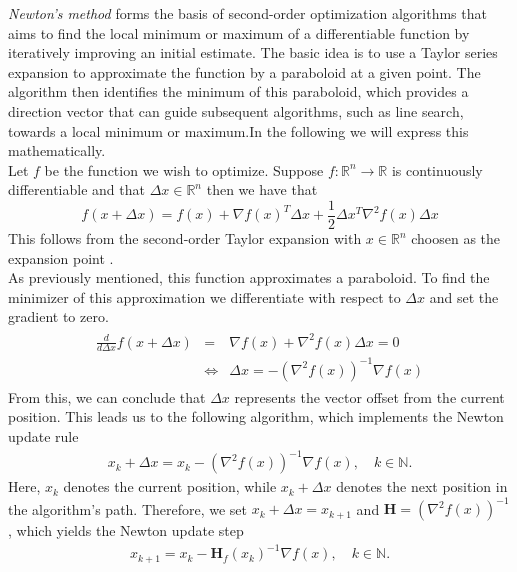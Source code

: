 \emph{Newton's method} forms the basis of second-order optimization algorithms that aims to find the local minimum or maximum of a differentiable function by iteratively improving an initial estimate. 
The basic idea is to use a Taylor series expansion to approximate the function by a paraboloid at a given point.
The algorithm then identifies the minimum of this paraboloid, which provides a direction vector that can guide subsequent algorithms,
such as line search, towards a local minimum or maximum.In the following we will express this mathematically.\\
Let $f$ be the function we wish to optimize. 
Suppose \( f: \mathbb{R}^n \to \mathbb{R} \) is continuously differentiable and that $\Delta x \in \mathbb{R}^n$ then we have
that
\label{eq:taylor}
\begin{equation}
    f(x+\Delta x ) = f(x) + \nabla f(x)^T\Delta x  + \frac{1}{2}\Delta x ^T\nabla^2f(x)\Delta x 
\end{equation}
This follows from the second-order Taylor expansion with $x \in \mathbb{R}^n$ choosen as the expansion point \cite{nocedal2006numerical}.\\
As previously mentioned, this function approximates a paraboloid. To find the minimizer of this approximation we differentiate with respect to $\Delta x $ and set the gradient to zero.
\begin{align}
    \begin{array}{rcl}
    \frac{d}{d\Delta x } f(x+\Delta x ) & = & \nabla f(x) + \nabla^2 f(x) \Delta x  = 0 \\
    & \iff & \Delta x  = -(\nabla^2 f(x))^{-1} \nabla f(x)
    \end{array}
\end{align}
From this, we can conclude that $\Delta x $ represents the vector offset from the current position. This leads us to the following algorithm, which implements the Newton update rule
\begin{align}
x_k + \Delta x  = x_k - (\nabla^2 f(x))^{-1} \nabla f(x), \quad k \in \mathbb{N}.
\end{align}
Here, $x_k$ denotes the current position, while $x_k + \Delta x $ denotes the next position in the algorithm's path. Therefore, we set $x_k + \Delta x  = x_{k+1} $ and $ \mathbf{H} = (\nabla^2 f(x))^{-1} $, which yields the Newton update step \cite{nocedal2006numerical}
\begin{align}\label{eq:newtonstep}
x_{k+1} = x_k - \mathbf{H}_f(x_k)^{-1} \nabla f(x), \quad k \in \mathbb{N}.
\end{align}
